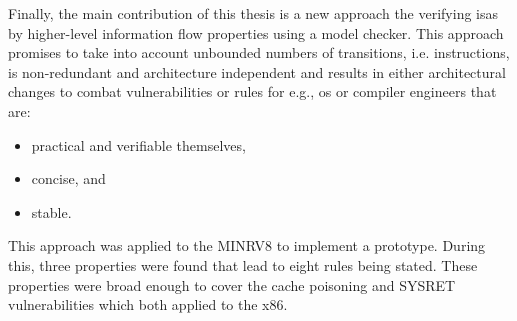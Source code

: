 Finally, the main contribution of this thesis is a new approach the verifying \glspl{isa} by higher-level information flow properties using a model checker.
This approach promises to take into account unbounded numbers of transitions, i.e. instructions, is non-redundant and architecture independent and results in either architectural changes to combat vulnerabilities or rules for e.g., \gls{os} or compiler engineers that are:
\begin{itemize}
    \item practical and verifiable themselves,
    \item concise, and
    \item stable.
\end{itemize}

This approach was applied to the MINRV8 to implement a prototype.
During this, three properties were found that lead to eight rules being stated.
These properties were broad enough to cover the cache poisoning and SYSRET vulnerabilities which both applied to the x86.
